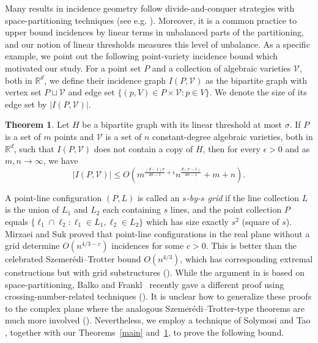 \documentclass[11pt]{article}
\theoremstyle{definition}
\newtheorem{theorem}{Theorem}[section]
\begin{document}
\medskip

Many results in incidence geometry follow divide-and-conquer strategies with space-partitioning techniques (see e.g. \cite{matouvsek1991efficient,kaplan2012simple}). Moreover, it is a common practice to upper bound incidences by linear terms in unbalanced parts of the partitioning, and our notion of linear thresholds measures this level of unbalance. As a specific example, we point out the following point-variety incidence bound which motivated our study. For a point set $P$ and a collection of algebraic varieties $\mathcal{V}$, both in $\mathbb{R}^d$, we define their incidence graph $I(P,\mathcal{V})$ as the bipartite graph with vertex set $P \sqcup \mathcal{V}$ and edge set $\{(p, V) \in P \times \mathcal{V}: p\in V\}$. We denote the size of its edge set by $|I(P,\mathcal{V})|$.

\begin{theorem}\label{threshold2incidence}
    Let $H$ be a bipartite graph with its linear threshold at most $\sigma$. If $P$ is a set of $m$ points and $\mathcal{V}$ is a set of $n$ constant-degree algebraic varieties, both in $\mathbb{R}^d$, such that $I(P,\mathcal{V})$ does not contain a copy of $H$, then for every $\epsilon > 0$ and as $m,n\to \infty$, we have\begin{equation*}
        |I(P,\mathcal{V})| \leq O\left( m^{\frac{(d-1)\sigma}{d\sigma-1}+\epsilon}n^{\frac{d(\sigma-1)}{d\sigma-1}} + m + n \right).
    \end{equation*}
\end{theorem}

A point-line configuration $(P, L)$ is called an \textit{$s$-by-$s$ grid} if the line collection $L$ is the union of $L_1$ and $L_2$ each containing $s$ lines, and the point collection $P$ equals $\{\ell_1 \cap \ell_2 : \ell_1 \in L_1, \ell_2 \in L_2 \}$ which has size exactly $s^2$ (square of $s$). Mirzaei and Suk \cite{mirzaei2021grids} proved that point-line configurations in the real plane without a grid determine $O(n^{4/3 - c})$ incidences for some $c > 0$. This is better than the celebrated Szemer\'edi--Trotter bound $O(n^{4/3})$, which has corresponding extremal constructions but with grid substructures (\cite{szemeredi1983extremal,elekes2001sums}). While the argument in \cite{mirzaei2021grids} is based on space-partitioning, Balko and Frankl~\cite{balko2024forbidden} recently gave a different proof using crossing-number-related techniques (\cite{szekely1997crossing,pach1999new}). It is unclear how to generalize these proofs to the complex plane where the analogous Szemer\'edi--Trotter-type theorems are much more involved (\cite{toth2015szemeredi,zahl2015szemeredi}). Nevertheless, we employ a technique of Solymosi and Tao \cite{solymosi2012incidence}, together with our Theorems~\ref{main} and~\ref{threshold2incidence}, to prove the following bound.
\end{document}
